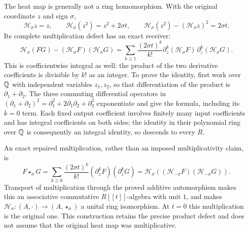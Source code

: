 \documentclass[11pt,a4paper]{article}
\theoremstyle{definition}\newtheorem{definition}[theorem]{Definition}
\providecommand{\Ht}{\mathcal H}
\begin{document}
The heat map is generally not a ring homomorphism. With the
original coordinate $z$ and sign $\sigma$,
\begin{equation}\tag{SH19}\label{sh:productdefectexample}
 \Ht_\sigma z=z,\qquad
 \Ht_\sigma(z^2)=z^2+2\sigma t,\qquad
 \Ht_\sigma(z^2)-(\Ht_\sigma z)^2=2\sigma t.
\end{equation}
Its complete multiplication defect has an exact receiver:
\begin{equation}\tag{SH20}\label{sh:productdefect}
 \Ht_\sigma(FG)-(\Ht_\sigma F)(\Ht_\sigma G)
 =\sum_{k\ge1}\frac{(2\sigma t)^k}{k!}
       \partial_z^k(\Ht_\sigma F)\,
       \partial_z^k(\Ht_\sigma G).
\end{equation}
This is coefficientwise integral as well: the product of the two
derivative coefficients is divisible by $k!$ as an integer.
To prove the identity, first work over $\mathbb Q$ with independent
variables $z_1,z_2$, so that differentiation of the product is
$\partial_1+\partial_2$. The three commuting differential
operators in
$(\partial_1+\partial_2)^2=\partial_1^2+
2\partial_1\partial_2+\partial_2^2$ exponentiate and give the
formula, including its $k=0$ term. Each fixed output coefficient
involves finitely many input coefficients and has integral
coefficients on both sides; the identity in their polynomial
ring over $\mathbb Q$ is consequently an integral identity, so descends
to every $R$.

An exact repaired multiplication, rather than an imposed
multiplicativity claim, is
\begin{equation}\tag{SH21}\label{sh:star}
 F\star_\sigma G
 =\sum_{k\ge0}\frac{(2\sigma t)^k}{k!}
                       (\partial_z^kF)(\partial_z^kG)
 =\Ht_\sigma((\Ht_{-\sigma}F)(\Ht_{-\sigma}G)).
\end{equation}
Transport of multiplication through the proved additive
automorphism makes this an associative commutative
$R[[t]]$-algebra with unit $1$, and makes
$\Ht_\sigma:(A,\cdot)\to(A,\star_\sigma)$ a unital
ring isomorphism. At $t=0$ this multiplication is the original
one. This construction retains the precise product defect and
does not assume that the original heat map was multiplicative.
\end{document}
